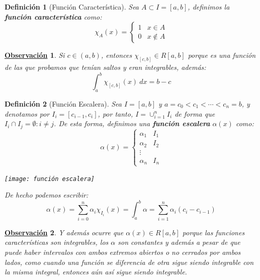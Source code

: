 \documentclass[10pt,a4paper,openright]{book}
\theoremstyle{break}
\newtheorem{defi}{Definición}[chapter]
\newtheorem{obs}{\underline{Observación}}[chapter]
\newcommand{\dif}[1]{\ d#1}
\begin{document}
\begin{defi}[Función Característica]
Sea $A\subset I=[a,b]$, definimos la \textbf{función característica} como:
$$\chi_A(x)=\begin{cases}1 & x\in A \\ 0 & x\notin A\end{cases}$$
\end{defi}

\begin{obs}
Si $c\in (a,b)$, entonces $\chi_{[c,b]}\in R[a,b]$ porque es una función de las que probamos que tenían saltos y eran integrables, además:
$$\int_{a}^{b}\chi_{[c,b]}(x)\dif{x}=b-c$$
\end{obs}

\begin{defi}[Función Escalera]
Sea $I=[a,b]$ y $a=c_0< c_1 <\cdots < c_n=b$, y denotamos por $I_i=[c_{i-1},c_i]$, por tanto, $I=\cup_{i=1}^n I_i$ de forma que $I_i\cap I_j = \emptyset : i\neq j$. De esta forma, definimos una \textbf{función escalera} $\alpha(x)$ como:
$$\alpha(x)=\begin{cases} \alpha_1 & I_1 \\ \alpha_2 & I_2 \\ \vdots \\ \alpha_n & I_n \end{cases}$$
\begin{center}
\texttt{[image: función escalera]}
\end{center}
De hecho podemos escribir:
$$\alpha(x)=\sum_{i=0}^{n}\alpha_i\chi_{I_i}(x) = \int_{a}^{b}\alpha = \sum_{i=1}^{n}\alpha_i (c_i-c_{i-1})$$
\end{defi}

\begin{obs}
Y además ocurre que $\alpha(x)\in R[a,b]$ porque las funciones características son integrables, los $\alpha$ son constantes y además a pesar de que puede haber intervalos con ambos extremos abiertos o no cerrados por ambos lados, como cuando una función se diferencia de otra sigue siendo integrable con la misma integral, entonces aún así sigue siendo integrable.
\end{obs}
\end{document}
